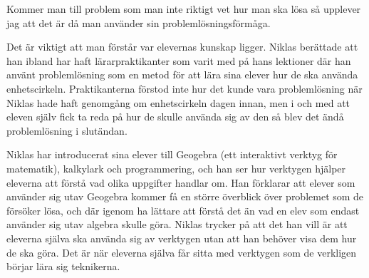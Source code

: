 \begin{displayquote}
\textcolor{turkos}{
Kommer man till problem som man inte riktigt vet hur man ska lösa så upplever jag att det är då man använder sin problemlösningsförmåga.
}
\end{displayquote}

\textcolor{turkos}{
Det är viktigt att man förstår var elevernas kunskap ligger. Niklas berättade att han ibland har haft lärarpraktikanter som varit med på hans lektioner där han använt problemlösning som en metod för att lära sina elever hur de ska använda enhetscirkeln. Praktikanterna förstod inte hur det kunde vara problemlösning när Niklas hade haft genomgång om enhetscirkeln dagen innan, men i och med att eleven själv fick ta reda på hur de skulle använda sig av den så blev det ändå problemlösning i slutändan. 
}

\textcolor{turkos}{
Niklas har introducerat sina elever till Geogebra (ett interaktivt verktyg för matematik), kalkylark och programmering, och han ser hur verktygen hjälper eleverna att förstå vad olika uppgifter handlar om. Han förklarar att elever som använder sig utav Geogebra kommer få en större överblick över problemet som de försöker lösa, och där igenom ha lättare att förstå det än vad en elev som endast använder sig utav algebra skulle göra. Niklas trycker på att det han vill är att eleverna själva ska använda sig av verktygen utan att han behöver visa dem hur de ska göra. Det är när eleverna själva får sitta med verktygen som de verkligen börjar lära sig teknikerna.
} 

